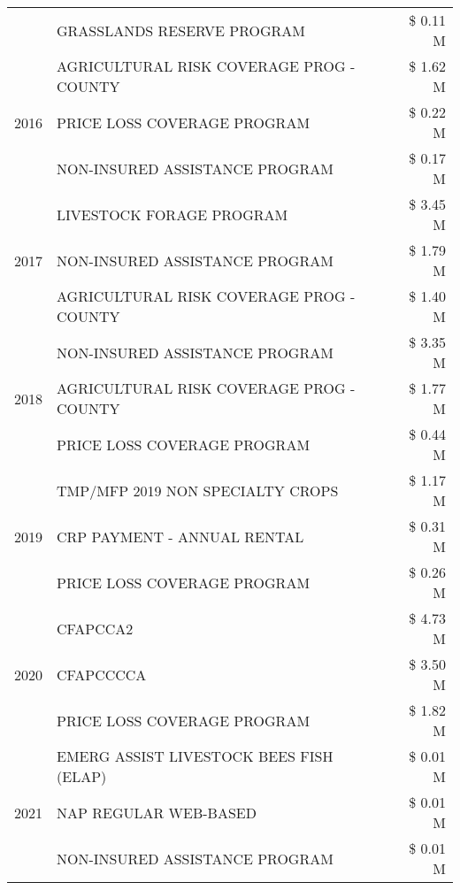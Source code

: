 \begin{tabular}{llr}
 & GRASSLANDS RESERVE PROGRAM & \$ 0.11 M \\
\cline{1-3}
\multirow[t]{3}{*}{2016} & AGRICULTURAL RISK COVERAGE PROG - COUNTY & \$ 1.62 M \\
 & PRICE LOSS COVERAGE PROGRAM & \$ 0.22 M \\
 & NON-INSURED ASSISTANCE PROGRAM & \$ 0.17 M \\
\cline{1-3}
\multirow[t]{3}{*}{2017} & LIVESTOCK FORAGE PROGRAM & \$ 3.45 M \\
 & NON-INSURED ASSISTANCE PROGRAM & \$ 1.79 M \\
 & AGRICULTURAL RISK COVERAGE PROG - COUNTY & \$ 1.40 M \\
\cline{1-3}
\multirow[t]{3}{*}{2018} & NON-INSURED ASSISTANCE PROGRAM & \$ 3.35 M \\
 & AGRICULTURAL RISK COVERAGE PROG - COUNTY & \$ 1.77 M \\
 & PRICE LOSS COVERAGE PROGRAM & \$ 0.44 M \\
\cline{1-3}
\multirow[t]{3}{*}{2019} & TMP/MFP 2019 NON SPECIALTY CROPS & \$ 1.17 M \\
 & CRP PAYMENT - ANNUAL RENTAL & \$ 0.31 M \\
 & PRICE LOSS COVERAGE PROGRAM & \$ 0.26 M \\
\cline{1-3}
\multirow[t]{3}{*}{2020} & CFAPCCA2 & \$ 4.73 M \\
 & CFAPCCCCA & \$ 3.50 M \\
 & PRICE LOSS COVERAGE PROGRAM & \$ 1.82 M \\
\cline{1-3}
\multirow[t]{3}{*}{2021} & EMERG ASSIST LIVESTOCK BEES FISH (ELAP) & \$ 0.01 M \\
 & NAP REGULAR WEB-BASED & \$ 0.01 M \\
 & NON-INSURED ASSISTANCE PROGRAM & \$ 0.01 M \\
\cline{1-3}
\bottomrule
\end{tabular}
